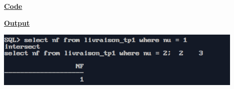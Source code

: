 \newpage
{}

\textbf{\underline{Code}}


\vspace{1cm}
\textbf{\underline{Output}}
\vspace{1cm}
\begin{center}
    \includegraphics[width=0.9\textwidth]{Questions/q21/q21.png}
\end{center}


